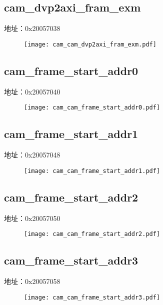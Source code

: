 \subsection{cam\_dvp2axi\_fram\_exm}
\label{cam-cam-dvp2axi-fram-exm}
地址：0x20057038
 \begin{figure}[H]
\texttt{[image: cam\_cam\_dvp2axi\_fram\_exm.pdf]}
\end{figure}

\subsection{cam\_frame\_start\_addr0}
\label{cam-cam-frame-start-addr0}
地址：0x20057040
 \begin{figure}[H]
\texttt{[image: cam\_cam\_frame\_start\_addr0.pdf]}
\end{figure}

\subsection{cam\_frame\_start\_addr1}
\label{cam-cam-frame-start-addr1}
地址：0x20057048
 \begin{figure}[H]
\texttt{[image: cam\_cam\_frame\_start\_addr1.pdf]}
\end{figure}

\subsection{cam\_frame\_start\_addr2}
\label{cam-cam-frame-start-addr2}
地址：0x20057050
 \begin{figure}[H]
\texttt{[image: cam\_cam\_frame\_start\_addr2.pdf]}
\end{figure}

\subsection{cam\_frame\_start\_addr3}
\label{cam-cam-frame-start-addr3}
地址：0x20057058
 \begin{figure}[H]
\texttt{[image: cam\_cam\_frame\_start\_addr3.pdf]}
\end{figure}


